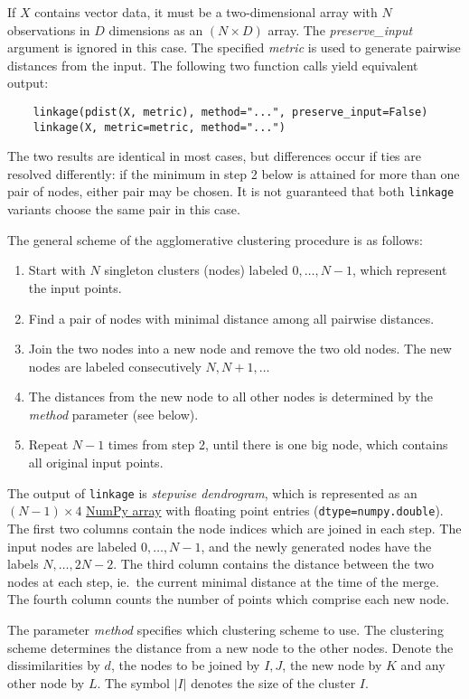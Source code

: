 \documentclass[fontsize=10pt,paper=letter,BCOR=-6mm,DIV=8]{scrartcl}
\makeatletter
\newcommand*\NumPyarray{\href{https://docs.scipy.org/doc/numpy/reference/generated/numpy.ndarray.html}{NumPy array}}
\newenvironment{methods}{%
  \list{}{\labelwidth\z@
    \itemindent-\leftmargin
    \let\makelabel\methodslabel}%
}{%
  \endlist
}
\newcommand*{\methodslabel}[1]{%
  \hbox to \textwidth{\hspace{\labelsep}%
  \normalfont\bfseries\ttfamily
  #1\hskip-\labelsep\hfill}%
}
\makeatother
\begin{document}
\begin{methods}
If $X$ contains vector data, it must be a two-dimensional array with $N$ observations in $D$ dimensions as an $(N\times D)$ array. The  \textit{preserve\_input} argument is ignored in this case. The specified \textit{metric} is used to generate pairwise distances from the input. The following two function calls yield equivalent output:
\begin{verbatim}
    linkage(pdist(X, metric), method="...", preserve_input=False)
    linkage(X, metric=metric, method="...")
\end{verbatim}

The two results are identical in most cases, but differences occur if ties are resolved differently: if the minimum in step 2 below is attained for more than one pair of nodes, either pair may be chosen. It is not guaranteed that both \texttt{linkage} variants choose the same pair in this case.

The general scheme of the agglomerative clustering procedure is as follows:
\begin{enumerate}
\item Start with $N$ singleton clusters (nodes) labeled $0,\ldots, N-1$, which represent the input points.
\item Find a pair of nodes with minimal distance among all pairwise distances.
\item Join the two nodes into a new node and remove the two old nodes. The new nodes are labeled consecutively $N,N+1,\ldots$
\item The distances from the new node to all other nodes is determined by the \textit{method} parameter (see below).
\item Repeat $N-1$ times from step 2, until there is one big node, which contains all original input points.
\end{enumerate}

The output of \texttt{linkage} is \emph{stepwise dendrogram}, which is represented as an $(N-1)\times 4$ \NumPyarray{} with floating point entries (\texttt{dtype=numpy.double}). The first two columns contain the node indices which are joined in each step. The input nodes are labeled $0,\ldots,N-1$, and the newly generated nodes have the labels $N,\ldots, 2N-2$. The third column contains the distance between the two nodes at each step, ie.\ the current minimal distance at the time of the merge. The fourth column counts the number of points which comprise each new node.

The parameter \textit{method} specifies which clustering scheme to use. The clustering scheme determines the distance from a new node to the other nodes. Denote the dissimilarities by $d$, the nodes to be joined by $I,J$, the new node by $K$ and any other node by $L$. The symbol $|I|$ denotes the size of the cluster $I$.


\end{methods}
\end{document}
